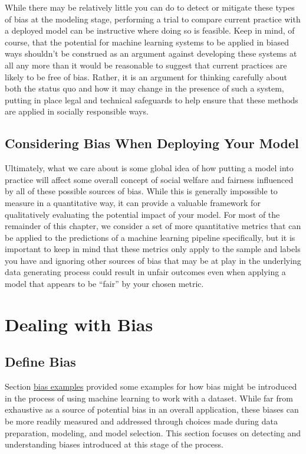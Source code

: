 \documentclass[]{krantz}
\begin{document}
While there may be relatively little you can do to detect or mitigate
these types of bias at the modeling stage, performing a trial to compare
current practice with a deployed model can be instructive where doing so
is feasible. Keep in mind, of course, that the potential for machine
learning systems to be applied in biased ways shouldn't be construed as
an argument against developing these systems at all any more than it
would be reasonable to suggest that current practices are likely to be
free of bias. Rather, it is an argument for thinking carefully about
both the status quo and how it may change in the presence of such a
system, putting in place legal and technical safeguards to help ensure
that these methods are applied in socially responsible ways.

\subsection{Considering Bias When Deploying Your
Model}\label{considering-bias-when-deploying-your-model}

Ultimately, what we care about is some global idea of how putting a
model into practice will affect some overall concept of social welfare
and fairness influenced by all of these possible sources of bias. While
this is generally impossible to measure in a quantitative way, it can
provide a valuable framework for qualitatively evaluating the potential
impact of your model. For most of the remainder of this chapter, we
consider a set of more quantitative metrics that can be applied to the
predictions of a machine learning pipeline specifically, but it is
important to keep in mind that these metrics only apply to the sample
and labels you have and ignoring other sources of bias that may be at
play in the underlying data generating process could result in unfair
outcomes even when applying a model that appears to be ``fair'' by your
chosen metric.

\section{Dealing with Bias}\label{dealing-with-bias}

\hypertarget{sec:metrics}{\subsection{Define Bias}\label{sec:metrics}}

Section \protect\hyperlink{sec:mlbiasexamples}{bias examples} provided
some examples for how bias might be introduced in the process of using
machine learning to work with a dataset. While far from exhaustive as a
source of potential bias in an overall application, these biases can be
more readily measured and addressed through choices made during data
preparation, modeling, and model selection. This section focuses on
detecting and understanding biases introduced at this stage of the
process.
\end{document}
